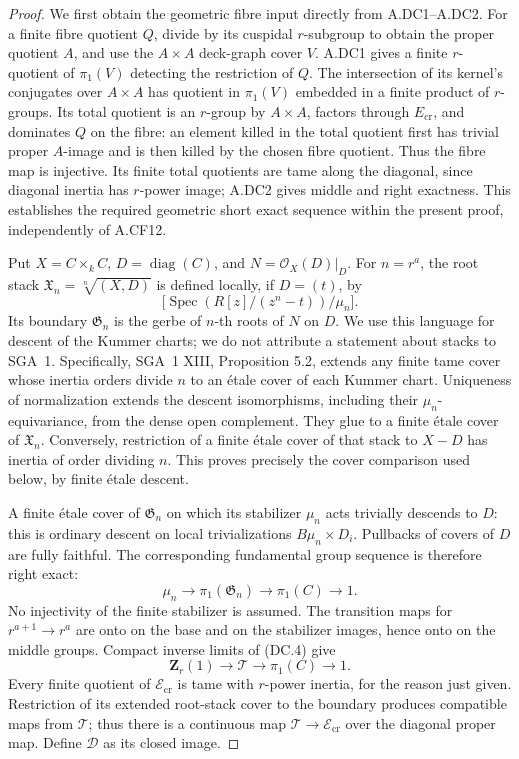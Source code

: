 \begin{proof}
We first obtain the geometric fibre input directly from A.DC1--A.DC2.
For a finite fibre quotient $Q$, divide by its cuspidal $r$-subgroup
to obtain the proper quotient $A$, and use the $A\times A$ deck-graph
cover $V$. A.DC1 gives a finite $r$-quotient of $\pi_1(V)$ detecting
the restriction of $Q$. The intersection of its kernel's conjugates
over $A\times A$ has quotient in $\pi_1(V)$ embedded in a finite
product of $r$-groups. Its total quotient is an $r$-group by
$A\times A$, factors through $E_{\mathrm{cr}}$, and dominates $Q$
on the fibre: an element killed in the total quotient first has
trivial proper $A$-image and is then killed by the chosen fibre
quotient. Thus the fibre map is injective. Its finite total quotients
are tame along the diagonal, since diagonal inertia has $r$-power
image; A.DC2 gives middle and right exactness. This establishes
the required geometric short exact sequence within the present
proof, independently of A.CF12.

Put $X=C\times_k C$, $D=\operatorname{diag}(C)$, and
$N=\mathcal O_X(D)|_D$. For $n=r^a$, the root stack
$\mathfrak X_n=\sqrt[n]{(X,D)}$ is defined locally, if $D=(t)$, by
\[
 \bigl[\operatorname{Spec}(R[z]/(z^n-t))/\mu_n\bigr].
\]
Its boundary $\mathfrak G_n$ is the gerbe of $n$-th roots of $N$ on
$D$. We use this language for descent of the Kummer charts; we do not
attribute a statement about stacks to SGA~1.
Specifically, SGA~1 XIII, Proposition 5.2, extends any finite tame
cover whose inertia orders divide $n$ to an \'etale cover of each
Kummer chart. Uniqueness of normalization extends the descent
isomorphisms, including their $\mu_n$-equivariance, from the dense open
complement. They glue to a finite \'etale cover of $\mathfrak X_n$.
Conversely, restriction of a finite \'etale cover of that stack to
$X-D$ has inertia of order dividing $n$. This proves precisely the
cover comparison used below, by finite \'etale descent.

A finite \'etale cover of $\mathfrak G_n$ on which its stabilizer
$\mu_n$ acts trivially descends to $D$: this is ordinary descent on
local trivializations $B\mu_n\times D_i$. Pullbacks of covers of $D$
are fully faithful. The corresponding fundamental group sequence is
therefore right exact:
\[
 \mu_n\longrightarrow\pi_1(\mathfrak G_n)
 \longrightarrow\pi_1(C)\longrightarrow1.                       \tag{DC.4}
\]
No injectivity of the finite stabilizer is assumed. The transition
maps for $r^{a+1}\to r^a$ are onto on the base and on the stabilizer
images, hence onto on the middle groups. Compact inverse limits of
(DC.4) give
\[
 \mathbf Z_r(1)\longrightarrow\mathcal T
 \longrightarrow\pi_1(C)\longrightarrow1.                      \tag{DC.5}
\]
Every finite quotient of $\mathcal E_{\mathrm{cr}}$ is tame with
$r$-power inertia, for the reason just given.
Restriction of its extended root-stack cover to the boundary produces
compatible maps from $\mathcal T$; thus there is a continuous map
$\mathcal T\to\mathcal E_{\mathrm{cr}}$ over the diagonal proper
map. Define $\mathcal D$ as its closed image.


\end{proof}
